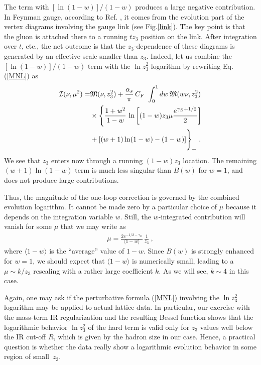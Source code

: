 The term with $[\ln (1-w)]/(1-w)$  produces  a large negative contribution.
In Feynman gauge, according to Ref. \cite{Radyushkin:2017lvu},  it comes from the evolution part of the  vertex diagrams
  involving
    the gauge link      (see Fig.\ref{link}).  The key point is   that the gluon is attached there  to
    a running $tz_3$  position on the link.  After integration
    over $t$,  etc., the net outcome is  that the $z_3$-dependence
    of these diagrams  is generated by an effective  scale  smaller than $z_3$.
    Indeed, let  us   combine the  $[\ln (1-w)]/(1-w)$   term with the $\ln z_3^2$ logarithm
    by rewriting Eq. (\ref{MNL}) as
    \begin{align}
{\cal I}  (\nu, \mu^2)    = & {\mathfrak  M} ( \nu, z_3^2) +  \frac{\alpha_s}{\pi} \, C_F\
 \int_0^1  dw \,   {\mathfrak  M}  (w \nu,z_3^2)   \nonumber \\  &
 \times  \Biggl   \{   \frac{1+w^2}{1-w}  \,  \ln \left [(1-w)z_3  \mu \frac{  e^{\gamma_E+1/2}}{2} \right ]
\nonumber \\  &
+   \left [   (w+1)  \ln (1-w)  -(1-w) \right ] \Biggr  \} _+
\   .
\label{MNL2}
 \end{align}
 We  see that $z_3$  enters now through  a running $(1-w)z_3$  location.
 The remaining  $(w+1) \ln (1-w)$  term is much less  singular
 than $B(w)$ for $w=1$, and does not produce large contributions.

 Thus, the magnitude
 of the one-loop correction is governed by the combined evolution logarithm.
 It cannot be made zero by a particular choice of $\mu$  because
 it depends on the integration variable $w$.
 Still,   the $w$-integrated contribution will vanish for some $\mu$   that
 we may write as
     \begin{align}
\mu =  \frac{2 e^{-1/2-\gamma_E}}{\langle 1-w \rangle   }\, \frac1{z_3} \ ,
\end{align}
    where $\langle 1-w \rangle $  is the ``average''  value of $1-w$.
    Since $B(w)$  is strongly enhanced for $w=1$, we should expect
    that $\langle 1-w \rangle $ is  numerically small,
    leading to a $\mu \sim k/z_3$ rescaling with a  rather large coefficient $k$.
 As we will see, $k \sim 4$ in this case.


  Again, one may  ask  if
the perturbative formula (\ref{MNL})  involving the
$\ln  z_3^2 $ logarithm may be applied to  actual   lattice data.
 In particular, our exercise with the mass-term IR regularization
 and the  resulting  Bessel function shows
 that
 the logarithmic behavior $\ln z_3^2 $
 of the hard term is valid   only for $z_3 $  values well   below
the IR cut-off $R$, which is given by  the hadron size in our case.
Hence, a practical question is whether
  the data  really
show a logarithmic evolution behavior  in some region of  \mbox{small $z_3$. }
